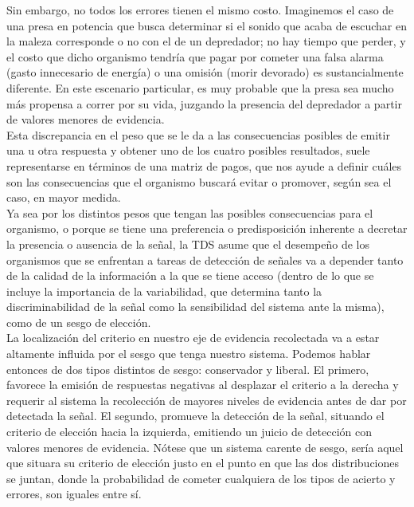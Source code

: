 \begin{itemize}
\begin{itemize}
 Sin embargo, no todos los errores tienen el mismo costo. Imaginemos el caso de una presa en potencia que busca determinar si el sonido que acaba de escuchar en la maleza corresponde o no con el de un depredador; no hay tiempo que perder, y el costo que dicho organismo tendría que pagar por cometer una falsa alarma (gasto innecesario de energía) o una omisión (morir devorado) es sustancialmente diferente. En este escenario particular, es muy probable que la presa sea mucho más propensa a correr por su vida, juzgando la presencia del depredador a partir de valores menores de evidencia.\\

Esta discrepancia en el peso que se le da a las consecuencias posibles de emitir una u otra respuesta y obtener uno de los cuatro posibles resultados, suele representarse en términos de una matriz de pagos, que nos ayude a definir cuáles son las consecuencias que el organismo buscará evitar o promover, según sea el caso, en mayor medida.\\

Ya sea por los distintos pesos que tengan las posibles consecuencias para el organismo, o porque se tiene una preferencia o predisposición inherente a decretar la presencia o ausencia de la señal, la TDS asume que el desempeño de los organismos que se enfrentan a tareas de detección de señales va a depender tanto de la calidad de la información a la que se tiene acceso (dentro de lo que se incluye la importancia de la variabilidad, que determina tanto la discriminabilidad de la señal como la sensibilidad del sistema ante la misma), como de un sesgo de elección.\\

La localización del criterio en nuestro eje de evidencia recolectada va a estar altamente influida por el sesgo que tenga nuestro sistema. Podemos hablar entonces de dos tipos distintos de sesgo: conservador y liberal. El primero, favorece la emisión de respuestas negativas al desplazar el criterio a la derecha y requerir al sistema la recolección de mayores niveles de evidencia antes de dar por detectada la señal. El segundo, promueve la detección de la señal, situando el criterio de elección hacia la izquierda, emitiendo un juicio de detección con valores menores de evidencia. Nótese que un sistema carente de sesgo, sería aquel que situara su criterio de elección justo en el punto en que las dos distribuciones se juntan, donde la probabilidad de cometer cualquiera de los tipos de acierto y errores, son iguales entre sí.\\


\end{itemize}
\end{itemize}
